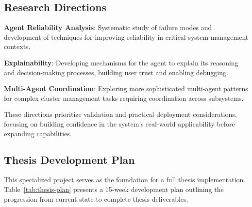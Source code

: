 \subsection{Research Directions}

\textbf{Agent Reliability Analysis}: Systematic study of failure modes and development of techniques for improving reliability in critical system management contexts.

\textbf{Explainability}: Developing mechanisms for the agent to explain its reasoning and decision-making processes, building user trust and enabling debugging.

\textbf{Multi-Agent Coordination}: Exploring more sophisticated multi-agent patterns for complex cluster management tasks requiring coordination across subsystems.

These directions prioritize validation and practical deployment considerations, focusing on building confidence in the system's real-world applicability before expanding capabilities.

\subsection{Thesis Development Plan}

This specialized project serves as the foundation for a full thesis implementation. Table~\ref{tab:thesis-plan} presents a 15-week development plan outlining the progression from current state to complete thesis deliverables.

